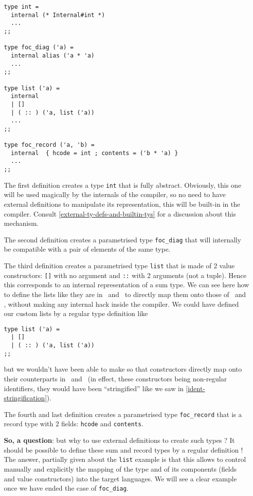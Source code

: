 {\footnotesize
\begin{lstlisting}[title=External type definitions]
type int =
  internal (* Internal#int *)
  ...
;;

type foc_diag ('a) =
  internal alias ('a * 'a)
  ...
;;

type list ('a) =
  internal
  | []
  | ( :: ) ('a, list ('a))
  ...
;;

type foc_record ('a, 'b) =
  internal  { hcode = int ; contents = ('b * 'a) }
  ...
;;
\end{lstlisting}}

The first definition creates a type {\tt int} that is fully
abstract. Obviously, this one will be used magically by the internals
of the compiler, so no need to have external definitions to manipulate
its representation, this will be built-in in the compiler. Consult
\ref{external-ty-defs-and-builtin-tys} for a discussion about this
mechanism.

The second definition creates a parametrised type {\tt foc\_diag}
that will internally be compatible with a pair of elements of the same
type.

The third definition creates a parametrised type {\tt list} that is
made of 2 value constructors: {\tt []} with no argument and {\tt ::}
with 2 arguments (not a tuple). Hence this corresponds to an internal
representation of a sum type. We can see here how to define the lists
like they are in \coq\ and \ocaml\ to directly map them onto those of 
\coq\ and \ocaml, without making any internal hack inside the
compiler. We could have defined our custom lists by a regular type
definition like

{\footnotesize
\begin{lstlisting}
type list ('a) =
  | []
  | ( :: ) ('a, list ('a))
;;
\end{lstlisting}}

\noindent but we wouldn't have been able to make so that constructors directly
map onto their counterparts in \coq\ and \ocaml\ (in effect, these
constructors being non-regular identifiers, they would have been
``stringified'' like we saw in \ref{ident-stringification}).

The fourth and last definition creates a parametrised type
{\tt foc\_record} that is a record type with 2 fields:
{\tt hcode} and {\tt contents}.

\medskip
{\bf So, a question}: but why to use external definitions to create
such types ? It should be possible to define these sum and record
types by a regular definition ! The answer, partially given about the
{\tt list} example is that this allows to control manually and
explicitly the mapping of the type and of its components (fields and
value constructors) into the target languages. We will see a clear
example once we have ended the case of {\tt foc\_diag}.

